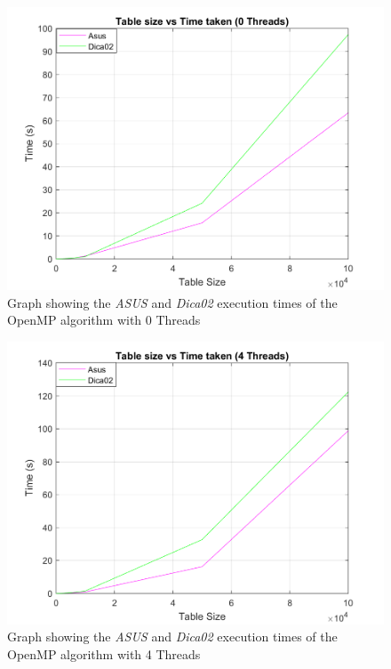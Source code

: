 \documentclass[10pt, conference]{IEEEtran}
\begin{document}
\begin{figure}[h!]
\renewcommand{\thefigure}{\arabic{figure}}
\centering
\includegraphics[scale=0.30]{Thread0.png}
\caption{Graph showing the \emph{ASUS} and \emph{Dica02} execution times of the OpenMP algorithm with 0 Threads}
\label{fig: OpenMP Thread0}
\end{figure}
\begin{figure}[h!]
\renewcommand{\thefigure}{\arabic{figure}}
\centering
\includegraphics[scale=0.30]{Thread4.png}
\caption{Graph showing the \emph{ASUS} and \emph{Dica02} execution times of the OpenMP algorithm with 4 Threads}
\label{fig: OpenMP Thread4}
\end{figure}
\end{document}
